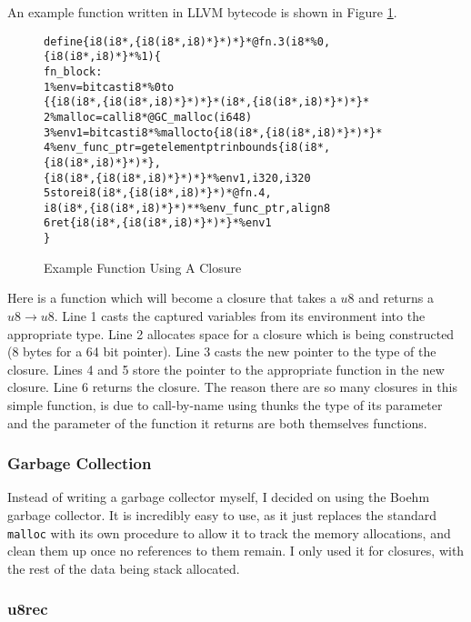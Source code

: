An example function written in LLVM bytecode is shown in Figure \ref{fig:closure}.
\begin{figure}
    \begin{alltt}
define \{ i8 (i8*, \{ i8 (i8*, i8)* \}*)* \}* @fn.3(i8* \%0, \{ i8 (i8*, i8)* \}* \%1) \{
fn_block:
1 \%env = bitcast i8* \%0 to
    \{ \{ i8 (i8*, \{ i8 (i8*, i8)* \}*)* \}* (i8*, \{ i8 (i8*, i8)* \}*)* \}*
2 \%malloc = call i8* @GC_malloc(i64 8)
3 \%env1 = bitcast i8* \%malloc to \{ i8 (i8*, \{ i8 (i8*, i8)* \}*)* \}*
4 \%env_func_ptr = getelementptr inbounds \{ i8 (i8*, \{ i8 (i8*, i8)* \}*)* \},
    \{ i8 (i8*, \{ i8 (i8*, i8)* \}*)* \}* \%env1, i32 0, i32 0
5 store i8 (i8*, \{ i8 (i8*, i8)* \}*)* @fn.4,
    i8 (i8*, \{ i8 (i8*, i8)* \}*)** \%env_func_ptr, align 8
6 ret \{ i8 (i8*, \{ i8 (i8*, i8)* \}*)* \}* \%env1
\}
    \end{alltt}
    \caption{Example Function Using A Closure}
    \label{fig:closure}
\end{figure}
Here is a function which will become a closure that takes a $u8$ and returns a $u8 \rightarrow u8$.
Line 1 casts the captured variables from its environment into the appropriate type.
Line 2 allocates space for a closure which is being constructed (8 bytes for a 64 bit pointer).
Line 3 casts the new pointer to the type of the closure.
Lines 4 and 5 store the pointer to the appropriate function in the new closure.
Line 6 returns the closure.
The reason there are so many closures in this simple function, is due to call-by-name using thunks
the type of its parameter and the parameter of the function it returns are both themselves functions.

\subsubsection{Garbage Collection}

Instead of writing a garbage collector myself, I decided on using the Boehm garbage collector.
It is incredibly easy to use, as it just replaces the standard \texttt{malloc} with its own procedure
to allow it to track the memory allocations, and clean them up once no references to them remain.
I only used it for closures, with the rest of the data being stack allocated.

\subsubsection{u8rec}
